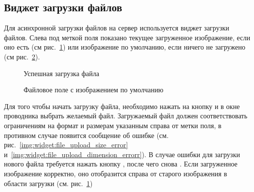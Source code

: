 \subsection{Виджет загрузки файлов}
\label{widget:file_upload}
Для асинхронной загрузки файлов на сервер используется виджет загрузки файлов. Слева под меткой поля показано текущее загруженное изображение, если оно есть (см рис.~\ref{img:widgets:file_upload_ok}) или изображение по умолчанию, если ничего не загружено (см рис.~\ref{img:widget:file_upload_default_logo}). 

\begin{figure}[H]
	\caption{Успешная загрузка файла}
	\label{img:widgets:file_upload_ok}
\end{figure}

\begin{figure}[H]
	\caption{Файловое поле с изображением по умолчанию}
	\label{img:widget:file_upload_default_logo}
\end{figure}

Для того чтобы начать загрузку файла, необходимо нажать на кнопку  и в окне проводника выбрать желаемый файл. Загружаемый файл должен соответствовать ограничениям на формат и размерам указанным справа от метки поля, в противном случае появится сообщение об ошибке (см. рис.~\ref{img:widget:file_upload_size_error} и~\ref{img:widget:file_upload_dimension_errorr}). В случае ошибки для загрузки нового файла требуется нажать кнопку , после чего снова . Если загруженное изображение корректно, оно отобразится справа от старого изображения в области загрузки (см. рис.~\ref{img:widgets:file_upload_ok})

